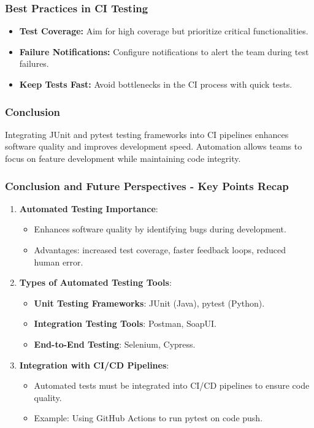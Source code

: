 \documentclass{beamer}
\begin{document}
\begin{frame}[fragile]
    \frametitle{Best Practices in CI Testing}
    \begin{itemize}
        \item \textbf{Test Coverage:} Aim for high coverage but prioritize critical functionalities.
        \item \textbf{Failure Notifications:} Configure notifications to alert the team during test failures.
        \item \textbf{Keep Tests Fast:} Avoid bottlenecks in the CI process with quick tests.
    \end{itemize}
\end{frame}

\begin{frame}[fragile]
    \frametitle{Conclusion}
    Integrating JUnit and pytest testing frameworks into CI pipelines enhances software quality and improves development speed. Automation allows teams to focus on feature development while maintaining code integrity.
\end{frame}

\begin{frame}[fragile]
    \frametitle{Conclusion and Future Perspectives - Key Points Recap}
    \begin{enumerate}
        \item \textbf{Automated Testing Importance}:
        \begin{itemize}
            \item Enhances software quality by identifying bugs during development.
            \item Advantages: increased test coverage, faster feedback loops, reduced human error.
        \end{itemize}

        \item \textbf{Types of Automated Testing Tools}:
        \begin{itemize}
            \item \textbf{Unit Testing Frameworks}: JUnit (Java), pytest (Python).
            \item \textbf{Integration Testing Tools}: Postman, SoapUI.
            \item \textbf{End-to-End Testing}: Selenium, Cypress.
        \end{itemize}

        \item \textbf{Integration with CI/CD Pipelines}:
        \begin{itemize}
            \item Automated tests must be integrated into CI/CD pipelines to ensure code quality.
            \item Example: Using GitHub Actions to run pytest on code push.
        \end{itemize}
    \end{enumerate}
\end{frame}
\end{document}
